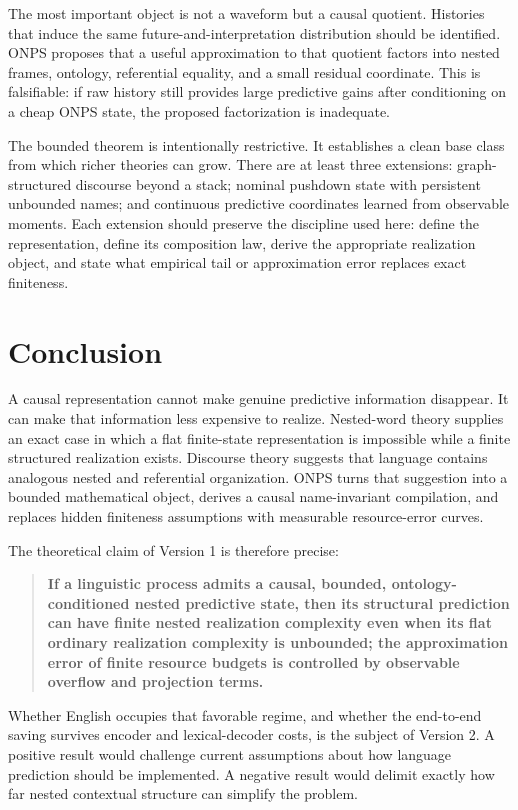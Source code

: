 \documentclass[11pt]{article}
\begin{document}
The most important object is not a waveform but a causal quotient. Histories that induce the same future-and-interpretation distribution should be identified. ONPS proposes that a useful approximation to that quotient factors into nested frames, ontology, referential equality, and a small residual coordinate. This is falsifiable: if raw history still provides large predictive gains after conditioning on a cheap ONPS state, the proposed factorization is inadequate.

The bounded theorem is intentionally restrictive. It establishes a clean base class from which richer theories can grow. There are at least three extensions: graph-structured discourse beyond a stack; nominal pushdown state with persistent unbounded names; and continuous predictive coordinates learned from observable moments. Each extension should preserve the discipline used here: define the representation, define its composition law, derive the appropriate realization object, and state what empirical tail or approximation error replaces exact finiteness.

\section{Conclusion}\label{conclusion}

A causal representation cannot make genuine predictive information disappear. It can make that information less expensive to realize. Nested-word theory supplies an exact case in which a flat finite-state representation is impossible while a finite structured realization exists. Discourse theory suggests that language contains analogous nested and referential organization. ONPS turns that suggestion into a bounded mathematical object, derives a causal name-invariant compilation, and replaces hidden finiteness assumptions with measurable resource-error curves.

The theoretical claim of Version 1 is therefore precise:

\begin{quote}
\textbf{If a linguistic process admits a causal, bounded, ontology-conditioned nested predictive state, then its structural prediction can have finite nested realization complexity even when its flat ordinary realization complexity is unbounded; the approximation error of finite resource budgets is controlled by observable overflow and projection terms.}
\end{quote}

Whether English occupies that favorable regime, and whether the end-to-end saving survives encoder and lexical-decoder costs, is the subject of Version 2. A positive result would challenge current assumptions about how language prediction should be implemented. A negative result would delimit exactly how far nested contextual structure can simplify the problem.
\end{document}
